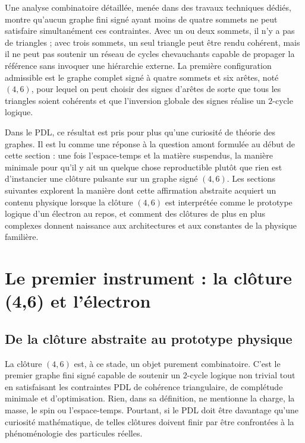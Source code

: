 \documentclass[11pt,a4paper]{article}
\theoremstyle{definition}
\begin{document}
Une analyse combinatoire détaillée, menée dans des travaux techniques dédiés, montre qu’aucun graphe fini signé ayant moins de quatre sommets ne peut satisfaire simultanément ces contraintes.\cite{Laubscher_MinimalClosures_46_2024} Avec un ou deux sommets, il n’y a pas de triangles ; avec trois sommets, un seul triangle peut être rendu cohérent, mais il ne peut pas soutenir un réseau de cycles chevauchants capable de propager la référence sans invoquer une hiérarchie externe. La première configuration admissible est le graphe complet signé à quatre sommets et six arêtes, noté \((4,6)\), pour lequel on peut choisir des signes d’arêtes de sorte que tous les triangles soient cohérents et que l’inversion globale des signes réalise un \(2\)-cycle logique.\cite{Laubscher_MinimalClosures_46_2024,Laubscher_EmergencePhysicalReality_2024}

Dans le PDL, ce résultat est pris pour plus qu’une curiosité de théorie des graphes. Il est lu comme une réponse à la question amont formulée au début de cette section : une fois l’espace-temps et la matière suspendus, la manière minimale pour qu’il y ait un quelque chose reproductible plutôt que rien est d’instancier une clôture pulsante sur un graphe signé \((4,6)\). Les sections suivantes explorent la manière dont cette affirmation abstraite acquiert un contenu physique lorsque la clôture \((4,6)\) est interprétée comme le prototype logique d’un électron au repos, et comment des clôtures de plus en plus complexes donnent naissance aux architectures et aux constantes de la physique familière.\cite{Laubscher_EmergencePhysicalReality_2024,Laubscher_Alpha_v2_2024,Laubscher_ProtonArch_v2_2024}

\section{Le premier instrument : la clôture (4,6) et l'électron}
\label{sec:46_electron}

\subsection{De la clôture abstraite au prototype physique}

La clôture \((4,6)\) est, à ce stade, un objet purement combinatoire. C’est le premier graphe fini signé capable de soutenir un \(2\)-cycle logique non trivial tout en satisfaisant les contraintes PDL de cohérence triangulaire, de complétude minimale et d’optimisation.\cite{Laubscher_MinimalClosures_46_2024,Laubscher_EmergencePhysicalReality_2024} Rien, dans sa définition, ne mentionne la charge, la masse, le spin ou l’espace-temps. Pourtant, si le PDL doit être davantage qu’une curiosité mathématique, de telles clôtures doivent finir par être confrontées à la phénoménologie des particules réelles.
\end{document}
